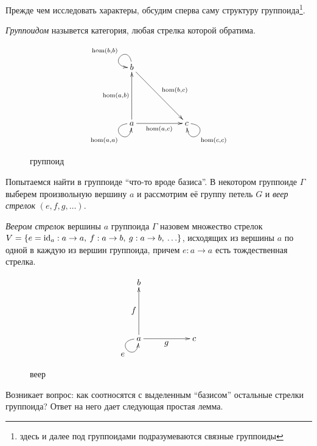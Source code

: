 
    Прежде чем исследовать характеры, обсудим сперва саму структуру группоида\footnote{здесь и далее под группоидами подразумеваются связные группоиды}.

    \begin{definition}\cite{MacLane}
        \emph{Группоидом} назывется категория, любая стрелка которой обратима.
    \end{definition}

    \begin{figure}[h]
        \centering
        \[\xymatrix{
            b \ar@(u,l)[]_{\hom(b,b)} \ar[ddrr]^{\hom(b,c)}                     & &                             \\
                                                                                & &                             \\
            a \ar@(l,d)[]_{\hom(a,a)} \ar[uu]^{\hom(a,b)} \ar[rr]_{\hom(a,c)}   & & c \ar@(r,d)[]^{\hom(c,c)}
        }\]
        \caption{группоид}
        \label{cd_groupoid}
    \end{figure}

    Попытаемся найти в группоиде ``что-то вроде базиса''. В некотором 
    группоиде $\Gamma$ выберем произвольную вершину $a$ и рассмотрим её группу 
    петель $G$ и \emph{веер стрелок} $(e, f, g,\ldots)$.

    \begin{definition}
        \emph{Веером стрелок} вершины $a$ группоида $\Gamma$ назовем 
        множество стрелок 
        $V = \{e = \operatorname*{id}_a : a \to a,\: f: a \to b,\: g: a \to b,\: \ldots\}$, 
        исходящих из вершины $a$ по одной в каждую из вершин группоида, причем 
        $e : a \to a$ есть тождественная стрелка.
    \end{definition}

    \begin{figure}[h]
        \centering
        \[\xymatrix{
            b                                                                           & &     \\
                                                                                        & &     \\
            a \ar@(l,d)[]_{\textstyle e} \ar[uu]^{\textstyle f} \ar[rr]_{\textstyle g}  & & c
        }\]
        \caption{веер}
        \label{cd_groupnfan}
    \end{figure}

    Возникает вопрос: как соотносятся с выделенным ``базисом'' остальные 
    стрелки группоида? Ответ на него дает следующая простая лемма.

